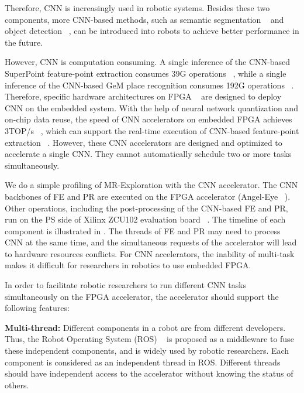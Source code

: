 Therefore, CNN is increasingly used in robotic systems. 
Besides these two components, more CNN-based methods, such as semantic segmentation  ~\cite{long2015fully} and object detection  ~\cite{ren2015faster}, can be introduced into robots to achieve better performance in the future. 

However, CNN is computation consuming. A single inference of the CNN-based SuperPoint feature-point extraction consumes 39G operations  ~\cite{detone2018superpoint}, while a single inference of the CNN-based GeM  place recognition consumes 192G operations  ~\cite{radenovic2018fine}.
Therefore, specific hardware architectures on FPGA  ~\cite{guo2017angel,yu2018instruction,li_high_2016,qiu2016going,lu_evaluating_2017} are designed to deploy CNN on the embedded system.
With the help of neural network quantization and on-chip data reuse, the speed of CNN accelerators on embedded FPGA achieves 3TOP/s  ~\cite{lu_evaluating_2017}, which can support the real-time execution of CNN-based feature-point extraction  ~\cite{detone2018superpoint}.
However, these CNN accelerators are designed and optimized to accelerate a single CNN. They cannot automatically schedule two or more tasks simultaneously. 



We do a simple profiling of MR-Exploration with the CNN accelerator. The CNN backbones of FE and  PR are executed on the FPGA accelerator (Angel-Eye ~\cite{guo2017angel}).
Other operations, including the post-processing of the CNN-based FE and PR, run on the PS side of Xilinx ZCU102 evaluation board ~\cite{zcu102}. The timeline of each component is illustrated in . 
The threads of FE and PR may need to process CNN at the same time,  and the simultaneous requests of the accelerator will lead to hardware resources conflicts. For CNN accelerators, the inability of multi-task makes it difficult for researchers in robotics to use embedded FPGA.

In order to facilitate robotic researchers to run different CNN tasks simultaneously on the FPGA accelerator, the accelerator should support the following features:

\textbf{Multi-thread:} Different components in a robot are from different developers. Thus, the Robot Operating System (ROS)  ~\cite{quigley2009ros} is proposed as a middleware to fuse these independent components, and is widely used by robotic researchers. Each component is considered as an independent thread in ROS. Different threads should have independent access to the accelerator without knowing the status of others.


